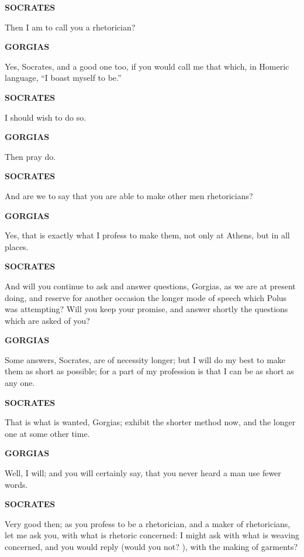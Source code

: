 \documentclass[11pt,letter]{article}
\begin{document}
\par \textbf{SOCRATES}
\par   Then I am to call you a rhetorician?

\par \textbf{GORGIAS}
\par   Yes, Socrates, and a good one too, if you would call me that which, in Homeric language, “I boast myself to be.”

\par \textbf{SOCRATES}
\par   I should wish to do so.

\par \textbf{GORGIAS}
\par   Then pray do.

\par \textbf{SOCRATES}
\par   And are we to say that you are able to make other men rhetoricians?

\par \textbf{GORGIAS}
\par   Yes, that is exactly what I profess to make them, not only at Athens, but in all places.

\par \textbf{SOCRATES}
\par   And will you continue to ask and answer questions, Gorgias, as we are at present doing, and reserve for another occasion the longer mode of speech which Polus was attempting? Will you keep your promise, and answer shortly the questions which are asked of you?

\par \textbf{GORGIAS}
\par   Some answers, Socrates, are of necessity longer; but I will do my best to make them as short as possible; for a part of my profession is that I can be as short as any one.

\par \textbf{SOCRATES}
\par   That is what is wanted, Gorgias; exhibit the shorter method now, and the longer one at some other time.

\par \textbf{GORGIAS}
\par   Well, I will; and you will certainly say, that you never heard a man use fewer words.

\par \textbf{SOCRATES}
\par   Very good then; as you profess to be a rhetorician, and a maker of rhetoricians, let me ask you, with what is rhetoric concerned:  I might ask with what is weaving concerned, and you would reply (would you not? ), with the making of garments?
\end{document}
